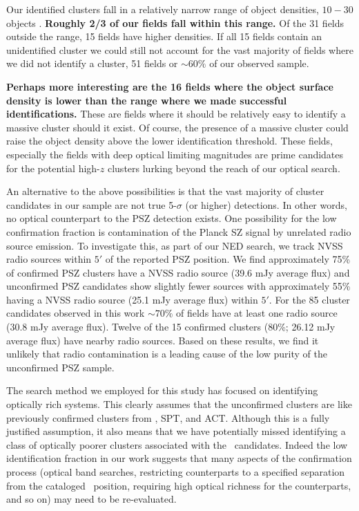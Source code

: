 \documentclass[apj, revtex4-1]{emulateapj}
\begin{document}
Our identified clusters fall in a relatively narrow range of object densities, $10-30$ objects \perarcminsq. \textbf{Roughly 2/3 of our fields fall within this range.} Of the 31 fields outside the range, 15 fields have higher densities. If all 15 fields contain an unidentified cluster we could still not account for the vast majority of fields where we did not identify a cluster, 51 fields or $\sim60\%$ of our observed sample.

\textbf{Perhaps more interesting are the 16 fields where the object surface density is lower than the range where we made successful identifications.} These are fields where it should be relatively easy to identify a massive cluster should it exist. Of course, the presence of a massive cluster could raise the object density above the lower identification threshold. These fields, especially the fields with deep optical limiting magnitudes are prime candidates for the potential high-$z$ clusters lurking beyond the reach of our optical search.

An alternative to the above possibilities is that the vast majority of cluster candidates in our sample are not true 5-$\sigma$ (or higher) detections.	In other words, no optical counterpart to the PSZ detection exists. One possibility for the low confirmation fraction is contamination of the Planck SZ signal by unrelated radio source emission. To investigate this, as part of our NED search, we track NVSS radio sources within $5'$ of the reported PSZ position. We find approximately 75\% of confirmed PSZ clusters have a NVSS radio source (39.6 mJy average flux) and unconfirmed PSZ candidates show slightly fewer sources with approximately 55\% having a NVSS radio source (25.1 mJy average flux) within $5'$. For the 85 cluster candidates observed in this work $\sim70\%$ of fields have at least one radio source (30.8 mJy average flux). Twelve of the 15 confirmed clusters (80\%; 26.12 mJy average flux) have nearby radio sources. Based on these results, we find it unlikely that radio contamination is a leading cause of the low purity of the unconfirmed PSZ sample.

The search method we employed for this study has focused on identifying optically rich systems. This clearly assumes that the unconfirmed clusters are like previously confirmed clusters from \planck, SPT, and ACT. Although this is a fully justified assumption, it also means that we have potentially missed identifying a class of optically poorer clusters associated with the \planck\ candidates. Indeed the low identification fraction in our work suggests that many aspects of the confirmation process (optical band searches, restricting counterparts to a specified separation from the cataloged \planck\ position, requiring high optical richness for the counterparts, and so on) may need to be re-evaluated.
\end{document}
